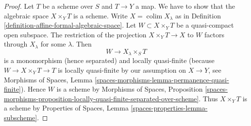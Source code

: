 \documentclass{stacks-project}
\theoremstyle{plain}
\theoremstyle{definition}
\theoremstyle{remark}
\numberwithin{equation}{subsection}
\def\colim{\mathop{\mathrm{colim}}\nolimits}
\begin{document}
\begin{proof}
Let $T$ be a scheme over $S$ and $T \to Y$ a map. We have to show that
the algebraic space $X \times_Y T$ is a scheme. Write $X = \colim X_\lambda$
as in Definition
\ref{definition-affine-formal-algebraic-space}.
Let $W \subset X \times_Y T$
be a quasi-compact open subspace. The restriction of the projection
$X \times_Y T \to X$ to $W$ factors through $X_\lambda$ for some $\lambda$.
Then
$$
W \to X_\lambda \times_S T
$$
is a monomorphism (hence separated) and locally quasi-finite (because
$W \to X \times_Y T \to T$ is locally quasi-finite by our assumption
on $X \to Y$, see Morphisms of Spaces, Lemma
\ref{spaces-morphisms-lemma-permanence-quasi-finite}).
Hence $W$ is a scheme by
Morphisms of Spaces, Proposition
\ref{spaces-morphisms-proposition-locally-quasi-finite-separated-over-scheme}.
Thus $X \times_Y T$ is a scheme by
Properties of Spaces, Lemma \ref{spaces-properties-lemma-subscheme}.
\end{proof}
\end{document}
